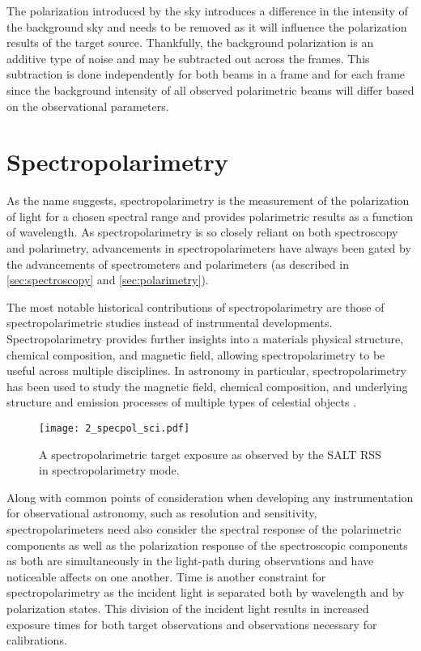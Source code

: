 The polarization introduced by the sky introduces a difference in the intensity of the background sky and needs to be removed as it will influence the polarization results of the target source. Thankfully, the background polarization is an additive type of noise and may be subtracted out across the frames. This subtraction is done independently for both beams in a frame and for each frame since the background intensity of all observed polarimetric beams will differ based on the observational parameters.

\section{Spectropolarimetry} \label{sec:spectropolarimetry} %

As the name suggests, spectropolarimetry is the measurement of the polarization of light for a chosen spectral range and provides polarimetric results as a function of wavelength. As spectropolarimetry is so closely reliant on both spectroscopy and polarimetry, advancements in spectropolarimeters have always been gated by the advancements of spectrometers and polarimeters (as described in \autoref{sec:spectroscopy} and \autoref{sec:polarimetry}).

The most notable historical contributions of spectropolarimetry are those of spectropolarimetric studies instead of instrumental developments. Spectropolarimetry provides further insights into a materials physical structure, chemical composition, and magnetic field, allowing spectropolarimetry to be useful across multiple disciplines. In astronomy in particular, spectropolarimetry has been used to study the magnetic field, chemical composition, and underlying structure and emission processes of multiple types of celestial objects \citep[see for example][]{specpol_AGN, specpol_stars, specpol_SN}.

\begin{figure}[t]
    \centering
    \texttt{[image: 2\_specpol\_sci.pdf]}
    \caption{A spectropolarimetric target exposure as observed by the \gls{SALT} \gls{RSS} in spectropolarimetry mode.}
    \label{fig:specpol_exp}
\end{figure}

Along with common points of consideration when developing any instrumentation for observational astronomy, such as resolution and sensitivity, spectropolarimeters need also consider the spectral response of the polarimetric components as well as the polarization response of the spectroscopic components as both are simultaneously in the light-path during observations and have noticeable affects on one another. Time is another constraint for spectropolarimetry as the incident light is separated both by wavelength and by polarization states. This division of the incident light results in increased exposure times for both target observations and observations necessary for calibrations.

